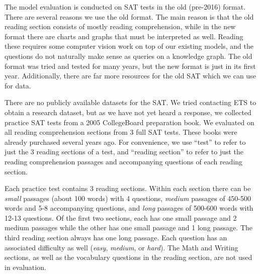 \documentclass[pageno]{final_paper}
\begin{document}
The model evaluation is conducted on SAT tests in the old (pre-2016) format.
There are several reasons we use the old format. The main reason is that the old
reading section consists of mostly reading comprehension, while in the new
format there are charts and graphs that must be interpreted as well. Reading
these requires some computer vision work on top of our existing models, and the
questions do not naturally make sense as queries on a knowledge graph. The old
format was tried and tested for many years, but the new format is just in its
first year. Additionally, there are far more resources for the old SAT which we
can use for data.

There are no publicly available datasets for the SAT. We tried contacting ETS to
obtain a research dataset, but as we have not yet heard a response, we collected
practice SAT tests from a 2005 CollegeBoard preparation book. We evaluated on
all reading comprehension sections from 3 full SAT tests. These books were
already purchased several years ago. For convenience, we use ``test'' to refer
to just the 3 reading sections of a test, and ``reading section'' to refer to
just the reading comprehension passages and accompanying questions of each
reading section.

Each practice test contains 3 reading sections. Within each section there can be
\textit{small} passages (about 100 words) with 4 questions, \textit{medium}
passages of 450-500 words and 5-8 accompanying questions, and \textit{long}
passages of 500-600 words with 12-13 questions. Of the first two sections, each
has one small passage and 2 medium passages while the other has one small
passage and 1 long passage. The third reading section always has one long
passage. Each question has an associated difficulty as well (\textit{easy},
\textit{medium}, or \textit{hard}). The Math and Writing sections, as well as
the vocabulary questions in the reading section, are not used in evaluation.
\end{document}
